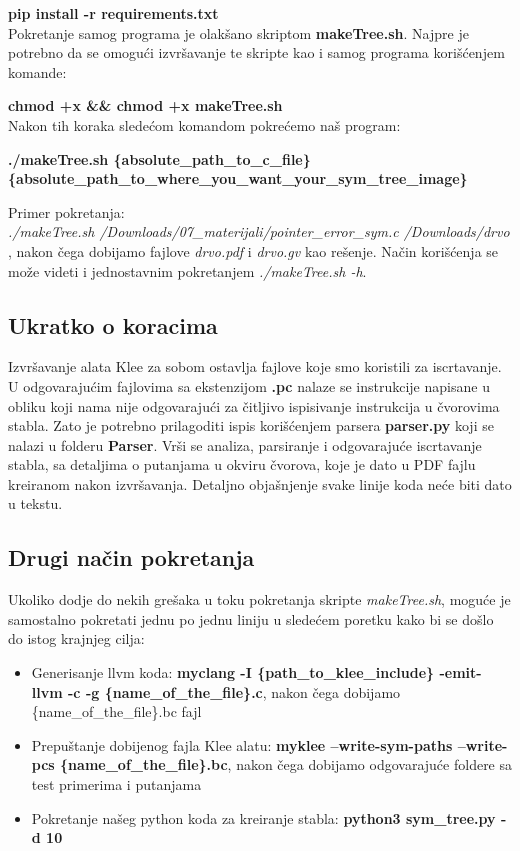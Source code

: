 \documentclass[a4paper]{article}
\begin{document}
\textbf{pip install -r requirements.txt} \\

Pokretanje samog programa je olakšano skriptom \textbf{makeTree.sh}. Najpre je potrebno da se omogući izvršavanje te skripte kao i samog programa korišćenjem komande:

\textbf{chmod +x \&\& chmod +x makeTree.sh} \\

Nakon tih koraka sledećom komandom pokrećemo naš program: 

\textbf{./makeTree.sh \{absolute\_path\_to\_c\_file\}\\ \{absolute\_path\_to\_where\_you\_want\_your\_sym\_tree\_image\} } 

Primer pokretanja:\\ \textit{./makeTree.sh /Downloads/07\_materijali/pointer\_error\_sym.c /Downloads/drvo }, nakon čega dobijamo fajlove \textit{drvo.pdf} i \textit{drvo.gv} kao rešenje. Način korišćenja se može videti i jednostavnim pokretanjem \textit{./makeTree.sh -h}.


\subsection{Ukratko o koracima}

Izvršavanje alata Klee za sobom ostavlja fajlove koje smo koristili za iscrtavanje. U odgovarajućim fajlovima sa ekstenzijom \textbf{.pc} nalaze se instrukcije napisane u obliku koji nama nije odgovarajući za čitljivo ispisivanje instrukcija u čvorovima stabla. Zato je potrebno prilagoditi ispis korišćenjem parsera \textbf{parser.py} koji se nalazi u folderu \textbf{Parser}. Vrši se analiza, parsiranje i odgovarajuće iscrtavanje stabla, sa detaljima o putanjama u okviru čvorova, koje je dato u PDF fajlu kreiranom nakon izvršavanja. Detaljno objašnjenje svake linije koda neće biti dato u tekstu.

\subsection{Drugi način pokretanja}
Ukoliko dodje do nekih grešaka u toku pokretanja skripte \textit{makeTree.sh}, moguće je samostalno pokretati jednu po jednu liniju u sledećem poretku kako bi se došlo do istog krajnjeg cilja:\\

\begin{itemize}
    \item {Generisanje llvm koda: \textbf{myclang -I \{path\_to\_klee\_include\} -emit-llvm -c -g \{name\_of\_the\_file\}.c}, nakon čega dobijamo \{name\_of\_the\_file\}.bc fajl}
    
    \item {Prepuštanje dobijenog fajla Klee alatu: \textbf{myklee --write-sym-paths --write-pcs \{name\_of\_the\_file\}.bc}, nakon čega dobijamo odgovarajuće foldere sa test primerima i putanjama}
    
    \item {Pokretanje našeg python koda za kreiranje stabla: \textbf{python3 sym\_tree.py -d 10}}
\end{itemize}
\end{document}
